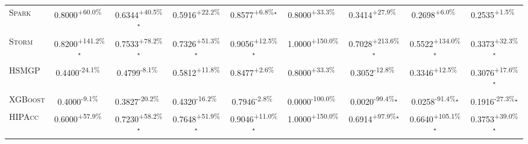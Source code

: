 \begin{table}[htbp]
\begin{tabular}{l|cccc|cccc}
\textsc{Spark} & \cellcolor{green!30}0.8000\textsuperscript{+60.0\%}$^{\,\,\,}$ & \cellcolor{green!30}0.6344\textsuperscript{+40.5\%}$^\star$ & \cellcolor{green!30}0.5916\textsuperscript{+22.2\%}$^{\,\,\,}$ & \cellcolor{green!30}0.8577\textsuperscript{+6.8\%}$^\star$ & \cellcolor{green!30}0.8000\textsuperscript{+33.3\%}$^{\,\,\,}$ & \cellcolor{green!30}0.3414\textsuperscript{+27.9\%}$^{\,\,\,}$ & \cellcolor{green!30}0.2698\textsuperscript{+6.0\%}$^{\,\,\,}$ & \cellcolor{green!30}0.2535\textsuperscript{+1.5\%}$^{\,\,\,}$ \\
\textsc{Storm} & \cellcolor{green!30}0.8200\textsuperscript{+141.2\%}$^\star$ & \cellcolor{green!30}0.7533\textsuperscript{+78.2\%}$^\star$ & \cellcolor{green!30}0.7326\textsuperscript{+51.3\%}$^\star$ & \cellcolor{green!30}0.9056\textsuperscript{+12.5\%}$^\star$ & \cellcolor{green!30}1.0000\textsuperscript{+150.0\%}$^{\,\,\,}$ & \cellcolor{green!30}0.7028\textsuperscript{+213.6\%}$^\star$ & \cellcolor{green!30}0.5522\textsuperscript{+134.0\%}$^\star$ & \cellcolor{green!30}0.3373\textsuperscript{+32.3\%}$^\star$ \\
\textsc{HSMGP} & \cellcolor{red!30}0.4400\textsuperscript{-24.1\%}$^{\,\,\,}$ & \cellcolor{red!30}0.4799\textsuperscript{-8.1\%}$^{\,\,\,}$ & \cellcolor{green!30}0.5812\textsuperscript{+11.8\%}$^{\,\,\,}$ & \cellcolor{green!30}0.8477\textsuperscript{+2.6\%}$^{\,\,\,}$ & \cellcolor{green!30}0.8000\textsuperscript{+33.3\%}$^{\,\,\,}$ & \cellcolor{red!30}0.3052\textsuperscript{-12.8\%}$^{\,\,\,}$ & \cellcolor{green!30}0.3346\textsuperscript{+12.5\%}$^{\,\,\,}$ & \cellcolor{green!30}0.3076\textsuperscript{+17.6\%}$^\star$ \\
\textsc{XGBoost} & \cellcolor{red!30}0.4000\textsuperscript{-9.1\%}$^{\,\,\,}$ & \cellcolor{red!30}0.3827\textsuperscript{-20.2\%}$^{\,\,\,}$ & \cellcolor{red!30}0.4320\textsuperscript{-16.2\%}$^{\,\,\,}$ & \cellcolor{red!30}0.7946\textsuperscript{-2.8\%}$^{\,\,\,}$ & \cellcolor{red!30}0.0000\textsuperscript{-100.0\%}$^{\,\,\,}$ & \cellcolor{red!30}0.0020\textsuperscript{-99.4\%}$^\star$ & \cellcolor{red!30}0.0258\textsuperscript{-91.4\%}$^\star$ & \cellcolor{red!30}0.1916\textsuperscript{-27.3\%}$^\star$ \\
\textsc{HIPAcc} & \cellcolor{green!30}0.6000\textsuperscript{+57.9\%}$^{\,\,\,}$ & \cellcolor{green!30}0.7230\textsuperscript{+58.2\%}$^\star$ & \cellcolor{green!30}0.7648\textsuperscript{+51.9\%}$^\star$ & \cellcolor{green!30}0.9046\textsuperscript{+11.0\%}$^\star$ & \cellcolor{green!30}1.0000\textsuperscript{+150.0\%}$^{\,\,\,}$ & \cellcolor{green!30}0.6914\textsuperscript{+97.9\%}$^\star$ & \cellcolor{green!30}0.6640\textsuperscript{+105.1\%}$^\star$ & \cellcolor{green!30}0.3753\textsuperscript{+39.0\%}$^\star$ \\

\end{tabular}
\end{table}
